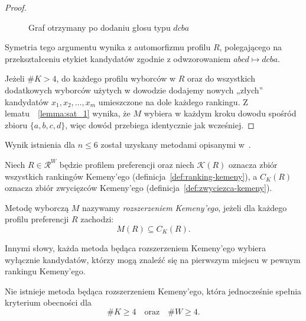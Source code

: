 \documentclass[12pt,a4paper]{mwrep}
\begin{document}
\begin{proof}
\begin{figure}[H]
			
			\caption{Graf otrzymany po dodaniu głosu typu \(dcba\)}
			\label{fig:graf_1_2}
			
		\end{figure}
		
		Symetria tego argumentu wynika z automorfizmu profilu \(R\), polegającego na przekształceniu etykiet kandydatów zgodnie z odwzorowaniem \(abcd \mapsto dcba\).
		
		Jeżeli \(\#K > 4\), do każdego profilu wyborców w \(R\) oraz do wszystkich dodatkowych wyborców użytych w dowodzie dodajemy nowych „złych” kandydatów \(x_1, x_2, \dots, x_m\) umieszczone na dole każdego rankingu. Z lematu~~\ref{lemma:sat_1} wynika, że \(M\) wybiera w każdym kroku dowodu spośród zbioru \(\{a,b,c,d\}\), więc dowód przebiega identycznie jak wcześniej.
	\end{proof}
	
	Wynik istnienia dla \(n \leq 6\) został uzyskany metodami opisanymi w~\cite{brandt2017sat}.
	
	\begin{definition}
		\label{def:kemeny-extension}
		Niech \(R \in \mathcal{R}^{W}\) będzie profilem preferencji oraz niech
		\(\mathcal{K}(R)\) oznacza zbiór wszystkich rankingów Kemeny’ego (definicja~\ref{def:ranking-kemeny}),
		a \(C_K(R)\) oznacza zbiór zwycięzców Kemeny’ego (definicja~\ref{def:zwyciezca-kemeny}).
		
		Metodę wyborczą \(M\) nazywamy \textit{rozszerzeniem Kemeny’ego},
		jeżeli dla każdego profilu preferencji \(R\) zachodzi:
		\[
		M(R) \subseteq C_K(R).
		\]
		
		Innymi słowy, każda metoda będąca rozszerzeniem Kemeny’ego wybiera wyłącznie
		kandydatów, którzy mogą znaleźć się na pierwszym miejscu w pewnym rankingu Kemeny’ego.
	\end{definition}
	
	\begin{theorem}
		Nie istnieje metoda będąca rozszerzeniem Kemeny'ego, która jednocześnie spełnia kryterium obecności dla
		\[
		\#K \geq 4
		\quad \text{oraz} \quad
		\#W \geq 4.
		\]
	\end{theorem}
	
\end{document}

